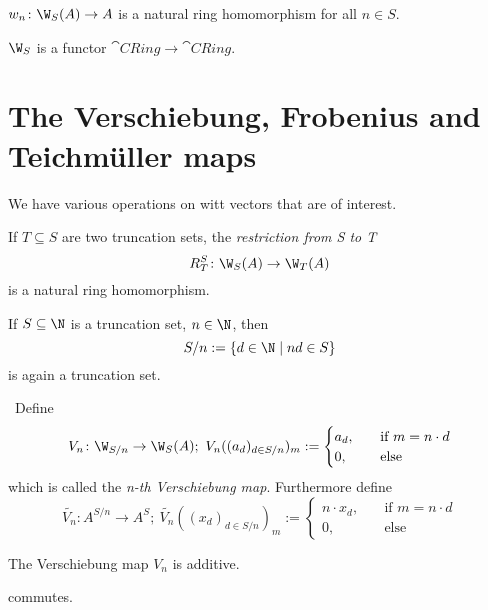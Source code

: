 \begin{bigproof}
    
\end{bigproof}
\begin{cor} \label{cor: ghost components are nat trafos}
    $w_n \colon \W_S(A) \to A$ is a natural ring homomorphism for all $n \in S$.
\end{cor}
\begin{proposition} \label{prop: W is a functor}
    $\W_S$ is a functor $\cat{CRing} \to \cat{CRing}$.
\end{proposition}
\section*{The Verschiebung, Frobenius and Teichmüller maps}
We have various operations on witt vectors that are of interest.
\begin{definition}
    If $T \subseteq S$ are two truncation sets, the \textit{restriction from S to T}
    \[
      R_T^S \colon \W_S(A) \to \W_T(A)  
    \]
    is a natural ring homomorphism.
\end{definition}
If $S\subseteq \N$ is a truncation set, $n \in \N$, then
\[
   S/n := \{d \in \N \mid nd \in S\}
\]
is again a truncation set.
\begin{definition}[Verschiebung] \
    Define 
    \[
        V_n \colon \W_{S/n} \to \W_S(A);\  
        V_n((a_d)_{d \in S/n})_m := 
        \begin{cases}
            a_d, &\quad \text{if $m=n \cdot d$} \\
            0,  &\quad \text{else}
        \end{cases}
    \]
    which is called the \textit{n-th Verschiebung map}. Furthermore define
    \[
        \widetilde{V_n} \colon A^{S/n} \to A^S;\ 
        \widetilde{V_n}((x_d)_{d \in S/n})_m := 
        \begin{cases}
            n \cdot x_d, &\quad \text{if $m=n \cdot d$} \\
            0,  &\quad \text{else}
        \end{cases}
    \]
\end{definition}
\begin{lemma} \label{lem: verschiebung is additive}
    The Verschiebung map $V_n$ is additive.
\end{lemma}
\begin{bigproof}
    \begin{claim*}
        commutes.
    \end{claim*}
    \begin{smallproof}
        
    \end{smallproof}
\end{bigproof}
